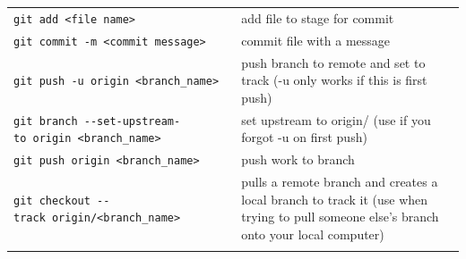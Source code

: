 \documentclass[]{book}
\begin{document}
\begin{longtable}[]{@{}ll@{}}
\begin{minipage}[t]{0.34\columnwidth}
\texttt{git\ add\ \textless{}file\ name\textgreater{}}\strut
\end{minipage} & \begin{minipage}[t]{0.60\columnwidth}\raggedright
add file to stage for commit\strut
\end{minipage}\tabularnewline
\begin{minipage}[t]{0.34\columnwidth}\raggedright
\texttt{git\ commit\ -m\ \textless{}commit\ message\textgreater{}}\strut
\end{minipage} & \begin{minipage}[t]{0.60\columnwidth}\raggedright
commit file with a message\strut
\end{minipage}\tabularnewline
\begin{minipage}[t]{0.34\columnwidth}\raggedright
\texttt{git\ push\ -u\ origin\ \textless{}branch\_name\textgreater{}}\strut
\end{minipage} & \begin{minipage}[t]{0.60\columnwidth}\raggedright
push branch to remote and set to track (-u only works if this is first push)\strut
\end{minipage}\tabularnewline
\begin{minipage}[t]{0.34\columnwidth}\raggedright
\texttt{git\ branch\ -\/-set-upstream-to\ origin\ \textless{}branch\_name\textgreater{}}\strut
\end{minipage} & \begin{minipage}[t]{0.60\columnwidth}\raggedright
set upstream to origin/ (use if you forgot -u on first push)\strut
\end{minipage}\tabularnewline
\begin{minipage}[t]{0.34\columnwidth}\raggedright
\texttt{git\ push\ origin\ \textless{}branch\_name\textgreater{}}\strut
\end{minipage} & \begin{minipage}[t]{0.60\columnwidth}\raggedright
push work to branch\strut
\end{minipage}\tabularnewline
\begin{minipage}[t]{0.34\columnwidth}\raggedright
\texttt{git\ checkout\ -\/-track\ origin/\textless{}branch\_name\textgreater{}}\strut
\end{minipage} & \begin{minipage}[t]{0.60\columnwidth}\raggedright
pulls a remote branch and creates a local branch to track it (use when trying to pull someone else's branch onto your local computer)\strut
\end{minipage}\tabularnewline
\begin{minipage}[t]{0.34\columnwidth}\raggedright

\end{minipage}
\end{longtable}
\end{document}

